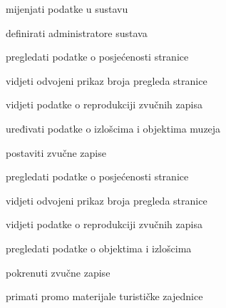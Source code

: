 \begin{packed_enum}

	\item  {}
	
	\begin{packed_enum}
		
		\item mijenjati podatke u sustavu
		\item definirati administratore sustava
		\item pregledati podatke o posjećenosti stranice
		\item vidjeti odvojeni prikaz broja pregleda stranice
		\item vidjeti podatke o reprodukciji zvučnih zapisa
		
	\end{packed_enum}

	\item  {}
	
	\begin{packed_enum}
		
		\item uređivati podatke o izlošcima i objektima muzeja
		\item postaviti zvučne zapise
		\item pregledati podatke o posjećenosti stranice
		\item vidjeti odvojeni prikaz broja pregleda stranice
		\item vidjeti podatke o reprodukciji zvučnih zapisa
		
	\end{packed_enum}

	\item  {}
	
	\begin{packed_enum}
		
		\item pregledati podatke o objektima i izlošcima
		\item pokrenuti zvučne zapise
		\item primati promo materijale turističke zajednice
		
	\end{packed_enum}
\newpage
		\item  {}
	
	\begin{packed_enum}
		

\end{packed_enum}
\end{packed_enum}
